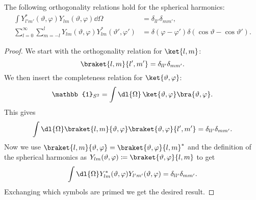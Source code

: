 \documentclass[fleqn]{NotesClass}
\newcommand*{\ident}{\mathbb{1}}
\begin{document}
    \begin{lma}{}{}
        The following orthogonality relations hold for the spherical harmonics:
        \begin{align}
            \int Y_{l'm'}^*(\vartheta, \varphi) Y_{lm}(\vartheta, \varphi) \dd{\Omega} &= \delta_{ll'}\delta_{mm'},\\
            \sum_{l = 0}^{\infty} \sum_{m = -l}^{l} Y_{lm}(\vartheta, \varphi)Y_{lm}^*(\vartheta', \varphi') &= \delta(\varphi - \varphi')\delta(\cos\vartheta - \cos\vartheta').
        \end{align}
        \begin{proof}
            We start with the orthogonality relation for \(\ket{l, m}\):
            \begin{equation}
                \braket{l, m}{l', m'} = \delta_{ll'}\delta_{mm'}.
            \end{equation}
            We then insert the completeness relation for \(\ket{\vartheta, \varphi}\):
            \begin{equation}
                \ident_{S^2} = \int \dl{\Omega} \, \ket{\vartheta, \varphi}\bra{\vartheta, \varphi}.
            \end{equation}
            This gives
            \begin{equation}
                \int\dl{\Omega} \braket{l, m}{\vartheta, \varphi}\braket{\vartheta, \varphi}{l', m'} = \delta_{ll'}\delta_{mm'}.
            \end{equation}
            Now we use \(\braket{l, m}{\vartheta, \varphi} = \braket{\vartheta, \varphi}{l, m}^*\) and the definition of the spherical harmonics as \(Y_{lm}(\vartheta, \varphi) \coloneqq \braket{\vartheta, \varphi}{l, m}\) to get
            \begin{equation}
                \int\dl{\Omega} Y_{lm}^*(\vartheta, \varphi)Y_{l'm'}(\vartheta, \varphi) = \delta_{ll'}\delta_{mm'}.
            \end{equation}
            Exchanging which symbols are primed we get the desired result.
            

\end{proof}
\end{lma}
\end{document}
